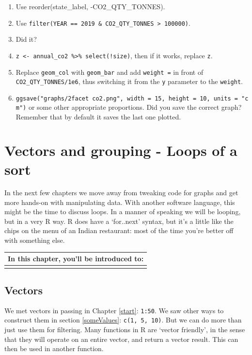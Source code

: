 \documentclass[
]{book}
\providecommand{\tightlist}{%
  \setlength{\itemsep}{0pt}\setlength{\parskip}{0pt}}
\begin{document}
\begin{enumerate}
\def\labelenumi{\arabic{enumi})}
\tightlist
\item
  Use reorder(state\_label, -CO2\_QTY\_TONNES).
\item
  Use \texttt{filter(YEAR\ ==\ 2019\ \&\ CO2\_QTY\_TONNES\ \textgreater{}\ 100000)}.
\item
  Did it?
\item
  \texttt{z\ \textless{}-\ annual\_co2\ \%\textgreater{}\%\ select(!size)}, then if it works, replace \texttt{z}.
\item
  Replace \texttt{geom\_col} with \texttt{geom\_bar} and add \texttt{weight\ =} in front of \texttt{CO2\_QTY\_TONNES/1e6}, thus switching it from the \texttt{y} parameter to the \texttt{weight}.
\item
  \texttt{ggsave("graphs/2facet\ co2.png",\ width\ =\ 15,\ height\ =\ 10,\ units\ =\ "cm")} or some other appropriate proportions. Did you save the correct graph? Remember that by default it saves the last one plotted.
\end{enumerate}

\hypertarget{vectors-and-grouping---loops-of-a-sort}{%
\chapter{Vectors and grouping - Loops of a sort}\label{vectors-and-grouping---loops-of-a-sort}}

In the next few chapters we move away from tweaking code for graphs and get more hands-on with manipulating data. With another software language, this might be the time to discuss loops. In a manner of speaking we will be looping, but in a very R way. R does have a `for..next' syntax, but it's a little like the chips on the menu of an Indian restaurant: most of the time you're better off with something else.

\begin{tabular}{l}
\hline
In this chapter, you'll be introduced to:\\
\hline
\\
\hline
\end{tabular}

\hypertarget{vectors}{%
\section{Vectors}\label{vectors}}

We met vectors in passing in Chapter \ref{start}: \texttt{1:50}. We saw other ways to construct them in section \ref{someValues}: \texttt{c(1,\ 5,\ 10)}. But we can do more than just use them for filtering. Many functions in R are `vector friendly', in the sense that they will operate on an entire vector, and return a vector result. This can then be used in another function.
\end{document}
